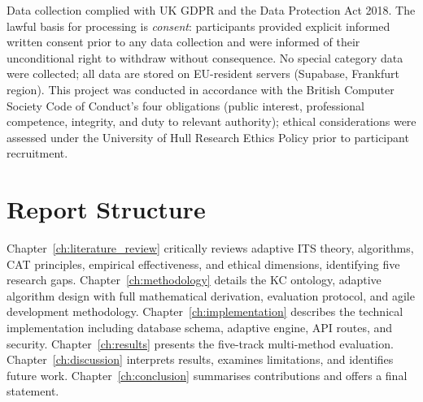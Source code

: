 Data collection complied with UK GDPR and the Data Protection Act 2018.
The lawful basis for processing is \textit{consent}: participants provided
explicit informed written consent prior to any data collection and were
informed of their unconditional right to withdraw without consequence.
No special category data were collected; all data are stored on EU-resident
servers (Supabase, Frankfurt region). This project was conducted in accordance
with the British Computer Society Code of Conduct's four obligations (public
interest, professional competence, integrity, and duty to relevant authority);
ethical considerations were assessed under the University of Hull Research
Ethics Policy prior to participant recruitment.

\section{Report Structure}
\label{sec:intro_structure}

Chapter~\ref{ch:literature_review} critically reviews adaptive ITS theory,
algorithms, CAT principles, empirical effectiveness, and ethical dimensions,
identifying five research gaps. Chapter~\ref{ch:methodology} details the
KC ontology, adaptive algorithm design with full mathematical derivation,
evaluation protocol, and agile development methodology.
Chapter~\ref{ch:implementation} describes the technical implementation
including database schema, adaptive engine, API routes, and security.
Chapter~\ref{ch:results} presents the five-track multi-method evaluation.
Chapter~\ref{ch:discussion} interprets results, examines limitations, and
identifies future work. Chapter~\ref{ch:conclusion} summarises contributions
and offers a final statement.
